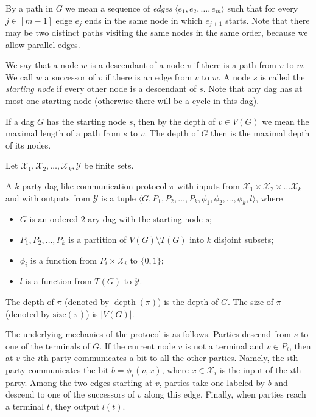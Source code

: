 \documentclass{toc}
\DeclareMathOperator{\depth}{depth}  %
\begin{document}
By a path in $G$ we mean a sequence of \emph{edges} $\langle e_1, e_2, \ldots, e_m\rangle$ such that for every $j\in[m - 1]$ edge $e_j$ ends in the same node in which $e_{j + 1}$ starts.  Note that there may be two distinct paths visiting the same nodes in the same order, because we allow parallel edges.

We say that a node $w$ is a descendant of a node $v$ if there is a path from $v$ to $w$. We call $w$ a successor of $v$ if there is an edge from $v$ to $w$. A node $s$ is called the \emph{starting node} if every other node is a descendant of $s$. Note that any dag has at most one starting node (otherwise there will be a cycle in this dag).

If a dag $G$ has the starting node $s$, then by the depth of $v\in V(G)$ we mean the maximal length of a path from $s$ to $v$. The depth of $G$ then is the maximal depth of its nodes. 

%
%
%
%
Let $\mathcal{X}_1, \mathcal{X}_2, \ldots, \mathcal{X}_k, \mathcal{Y}$
be finite sets.  %

\begin{definition}
\label{dag_like_protocol}
A $k$-party dag-like communication protocol $\pi$ with inputs from $\mathcal{X}_1 \times \mathcal{X}_2 \times \ldots \mathcal{X}_k$ and with outputs from $\mathcal{Y}$ is a tuple $\langle G, P_1, P_2, \ldots, P_k, \phi_1, \phi_2, \ldots, \phi_k, l\rangle$, where
\begin{itemize}
\item $G$ is an ordered $2$-ary dag with the starting node $s$;
\item $P_1, P_2, \ldots, P_k$ is a partition of $V(G)\setminus T(G)$ into $k$ disjoint subsets;
\item $\phi_i$ is a function from $P_i\times \mathcal{X}_i$ to $\{0, 1\}$;
\item $l$ is a function from $T(G)$ to $\mathcal{Y}$.
\end{itemize}
\end{definition}




The depth of $\pi$ (denoted by $\depth(\pi)$) is the depth of $G$. The size of $\pi$ (denoted by $\mathrm{size}(\pi)$) is  $|V(G)|$.


 The underlying mechanics of the protocol is as follows. Parties descend from $s$ to one of the terminals of $G$. If the current node $v$ is not a terminal and $v\in P_i$, then at $v$ the $i$th party communicates a bit to all the other parties. Namely, the $i$th party communicates the bit $b = \phi_i(v, x)$, where $x\in\mathcal{X}_i$ is the input of the $i$th party. Among the two edges starting at $v$, parties take one labeled by $b$ and descend to one of the successors of $v$ along this edge. Finally, when parties reach a terminal $t$, they output $l(t)$. 
\end{document}
